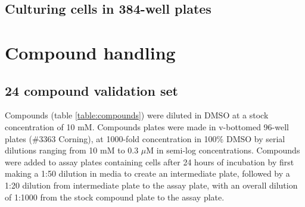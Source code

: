 \documentclass[a4paper,11pt,twoside,openright]{scrbook}
\begin{document}
\subsection{Culturing cells in 384-well plates}


\section{Compound handling}

\subsection{24 compound validation set}

Compounds (table \ref{table:compounds}) were diluted in DMSO at a stock concentration of 10 mM.
Compounds plates were made in v-bottomed 96-well plates (\#3363 Corning), at 1000-fold concentration in 100\% DMSO by serial dilutions ranging from 10 mM to 0.3 $\mu$M in semi-log concentrations.
Compounds were added to assay plates containing cells after 24 hours of incubation by first making a 1:50 dilution in media to create an intermediate plate, followed by a 1:20 dilution from intermediate plate to the assay plate, with an overall dilution of 1:1000 from the stock compound plate to the assay plate.
\end{document}

